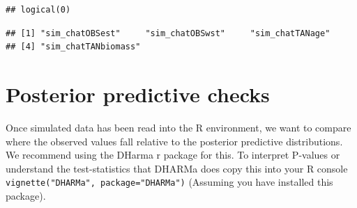 \documentclass[
]{book}
\newenvironment{Shaded}{\begin{snugshade}}{\end{snugshade}}
\newcommand{\AttributeTok}[1]{\textcolor[rgb]{0.77,0.63,0.00}{#1}}
\newcommand{\CommentTok}[1]{\textcolor[rgb]{0.56,0.35,0.01}{\textit{#1}}}
\newcommand{\ConstantTok}[1]{\textcolor[rgb]{0.00,0.00,0.00}{#1}}
\newcommand{\FunctionTok}[1]{\textcolor[rgb]{0.00,0.00,0.00}{#1}}
\newcommand{\NormalTok}[1]{#1}
\newcommand{\OtherTok}[1]{\textcolor[rgb]{0.56,0.35,0.01}{#1}}
\newcommand{\SpecialCharTok}[1]{\textcolor[rgb]{0.00,0.00,0.00}{#1}}
\newcommand{\StringTok}[1]{\textcolor[rgb]{0.31,0.60,0.02}{#1}}
\begin{document}
\begin{Shaded}
\end{Shaded}

\begin{verbatim}
## logical(0)
\end{verbatim}

\begin{Shaded}
\end{Shaded}

\begin{verbatim}
## [1] "sim_chatOBSest"     "sim_chatOBSwst"     "sim_chatTANage"    
## [4] "sim_chatTANbiomass"
\end{verbatim}

\hypertarget{posterior-predictive-checks}{%
\section{Posterior predictive checks}\label{posterior-predictive-checks}}

Once simulated data has been read into the R environment, we want to compare where the observed values fall relative to the posterior predictive distributions. We recommend using the DHarma r package for this. To interpret P-values or understand the test-statistics that DHARMa does copy this into your R console \texttt{vignette("DHARMa",\ package="DHARMa")} (Assuming you have installed this package).
\end{document}
